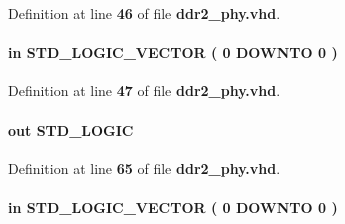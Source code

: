 Definition at line {\bf 46} of file {\bf ddr2\+\_\+phy.\+vhd}.

\paragraph[{ctl\+\_\+cke}]{ {\bfseries \textcolor{keywordflow}{in}\textcolor{vhdlchar}{ }} {\bfseries \textcolor{comment}{S\+T\+D\+\_\+\+L\+O\+G\+I\+C\+\_\+\+V\+E\+C\+T\+OR}\textcolor{vhdlchar}{ }\textcolor{vhdlchar}{(}\textcolor{vhdlchar}{ }\textcolor{vhdlchar}{ } \textcolor{vhdldigit}{0} \textcolor{vhdlchar}{ }\textcolor{keywordflow}{D\+O\+W\+N\+TO}\textcolor{vhdlchar}{ }\textcolor{vhdlchar}{ } \textcolor{vhdldigit}{0} \textcolor{vhdlchar}{ }\textcolor{vhdlchar}{)}\textcolor{vhdlchar}{ }} \hspace{0.3cm}{\ttfamily [Port]}}\label{classddr2__phy_ab7fa823c7dd07d586732898c9e9190bb}


Definition at line {\bf 47} of file {\bf ddr2\+\_\+phy.\+vhd}.

\paragraph[{ctl\+\_\+clk}]{ {\bfseries \textcolor{keywordflow}{out}\textcolor{vhdlchar}{ }} {\bfseries \textcolor{comment}{S\+T\+D\+\_\+\+L\+O\+G\+IC}\textcolor{vhdlchar}{ }} \hspace{0.3cm}{\ttfamily [Port]}}\label{classddr2__phy_abc3d4e7d63c1249e1e5de875e02bd67f}


Definition at line {\bf 65} of file {\bf ddr2\+\_\+phy.\+vhd}.

\paragraph[{ctl\+\_\+cs\+\_\+n}]{ {\bfseries \textcolor{keywordflow}{in}\textcolor{vhdlchar}{ }} {\bfseries \textcolor{comment}{S\+T\+D\+\_\+\+L\+O\+G\+I\+C\+\_\+\+V\+E\+C\+T\+OR}\textcolor{vhdlchar}{ }\textcolor{vhdlchar}{(}\textcolor{vhdlchar}{ }\textcolor{vhdlchar}{ } \textcolor{vhdldigit}{0} \textcolor{vhdlchar}{ }\textcolor{keywordflow}{D\+O\+W\+N\+TO}\textcolor{vhdlchar}{ }\textcolor{vhdlchar}{ } \textcolor{vhdldigit}{0} \textcolor{vhdlchar}{ }\textcolor{vhdlchar}{)}\textcolor{vhdlchar}{ }} \hspace{0.3cm}{\ttfamily [Port]}}\label{classddr2__phy_a1548193a9ae6ec8bf9da1dcbcbd75bc6}


